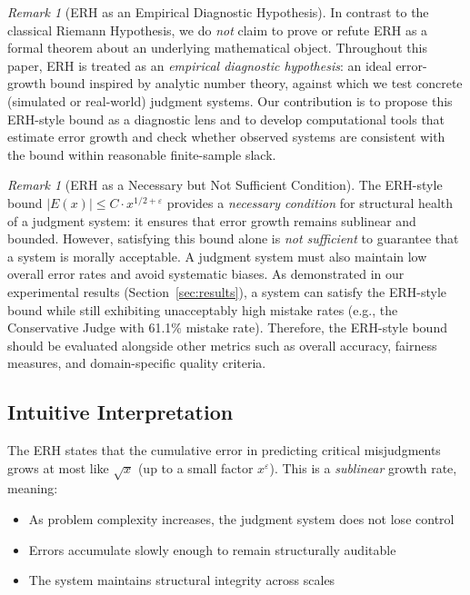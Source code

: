 \documentclass[12pt,a4paper]{article}
\theoremstyle{definition}
\theoremstyle{remark}
\newtheorem{remark}[theorem]{Remark}
\begin{document}
\begin{remark}[ERH as an Empirical Diagnostic Hypothesis]
\label{rem:erh_empirical}
In contrast to the classical Riemann Hypothesis, we do \emph{not} claim to prove or refute ERH as a formal theorem about an underlying mathematical object. Throughout this paper, ERH is treated as an \emph{empirical diagnostic hypothesis}: an ideal error-growth bound inspired by analytic number theory, against which we test concrete (simulated or real-world) judgment systems. Our contribution is to propose this ERH-style bound as a diagnostic lens and to develop computational tools that estimate error growth and check whether observed systems are consistent with the bound within reasonable finite-sample slack.
\end{remark}

\begin{remark}[ERH as a Necessary but Not Sufficient Condition]
\label{rem:erh_necessary}
The ERH-style bound $|E(x)| \leq C \cdot x^{1/2 + \varepsilon}$ provides a \emph{necessary condition} for structural health of a judgment system: it ensures that error growth remains sublinear and bounded. However, satisfying this bound alone is \emph{not sufficient} to guarantee that a system is morally acceptable. A judgment system must also maintain low overall error rates and avoid systematic biases. As demonstrated in our experimental results (Section~\ref{sec:results}), a system can satisfy the ERH-style bound while still exhibiting unacceptably high mistake rates (e.g., the Conservative Judge with 61.1\% mistake rate). Therefore, the ERH-style bound should be evaluated alongside other metrics such as overall accuracy, fairness measures, and domain-specific quality criteria.
\end{remark}

\subsection{Intuitive Interpretation}

The ERH states that the cumulative error in predicting critical misjudgments grows at most like $\sqrt{x}$ (up to a small factor $x^\varepsilon$). This is a \emph{sublinear} growth rate, meaning:

\begin{itemize}
    \item As problem complexity increases, the judgment system does not lose control
    \item Errors accumulate slowly enough to remain structurally auditable
    \item The system maintains structural integrity across scales
\end{itemize}
\end{document}
